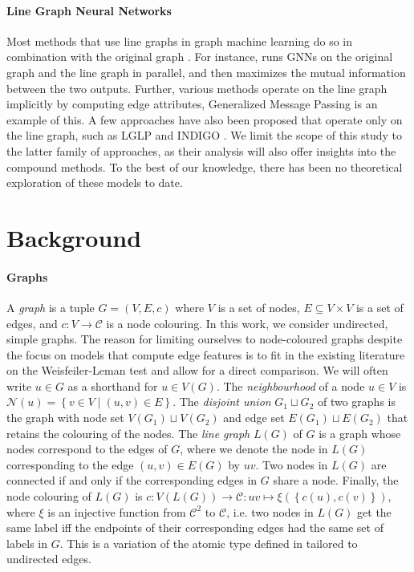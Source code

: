 \documentclass{article}
\newcommand{\set}[1]{\left\{#1\right\}}
\newcommand{\initdec}{\xi}
\newcommand{\nbh}{\mathcal{N}}
\newcommand{\mcc}{\mathcal{C}}
\begin{document}
\paragraph{Line Graph Neural Networks}
Most methods that use line graphs in graph machine learning do so in combination with the original graph \cite{choudhary2021atomistic,chen2017supervised,jiang2019censnet,zhang2023line}. For instance, \cite{zhang2023line} runs GNNs on the original graph and the line graph in parallel, and then maximizes the mutual information between the two outputs.
Further, various methods operate on the line graph implicitly by computing edge attributes, 
Generalized Message Passing \cite{battaglia2018relational} is an example of this.
A few approaches have also been proposed that operate only on the line graph, such as LGLP \cite{cai2021line} and INDIGO \cite{liu2021indigo}.
We limit the scope of this study to the latter family of approaches, as their analysis will also offer insights into the compound methods. To the best of our knowledge, there has been no theoretical exploration of these models to date.



\section{Background}    \label{sec:background}

\paragraph{Graphs}
A \emph{graph} is a tuple $G=(V,E,c)$ where $V$ is a set of nodes, $E\subseteq V\times V$ is a set of edges, and $c: V\rightarrow\mcc$ is a node colouring. In this work, we consider undirected, simple graphs.
The reason for limiting ourselves to node-coloured graphs despite the focus on models that compute edge features is to fit in the existing literature on the Weisfeiler-Leman test and allow for a direct comparison. We will often write $u\in G$ as a shorthand for $u\in V(G)$.
The \emph{neighbourhood} of a node $u\in V$ is $\nbh(u) = \set{v\in V \mid (u,v)\in E}$. The \emph{disjoint union} $G_1 \sqcup G_2$ of two graphs is the graph with node set $V(G_1) \sqcup V(G_2)$ and edge set $E(G_1) \sqcup E(G_2)$ that retains the colouring of the nodes.
The \emph{line graph} $L(G)$ of $G$ is a graph whose nodes correspond to the edges of $G$, where we denote the node in $L(G)$ corresponding to the edge $(u,v)\in E(G)$ by $uv$. Two nodes in $L(G)$ are connected if and only if the corresponding edges in $G$ share a node. Finally, the node colouring of $L(G)$ is $c: V(L(G)) \rightarrow \mcc: uv \mapsto \initdec(\set{c(u),c(v)})$, where $\initdec$ is an injective function from $\mcc^2$ to $\mcc$, i.e. two nodes in $L(G)$ get the same label iff the endpoints of their corresponding edges had the same set of labels in $G$. This is a variation of the atomic type defined in \cite{morris2019weisfeiler} tailored to undirected edges.
\end{document}
